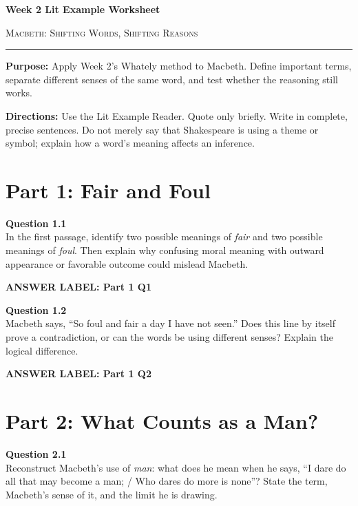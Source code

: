 \documentclass[12pt]{article}
\newcommand{\answerbox}[2]{%
\vspace{0.12em}
\noindent\textbf{#1}\par
\vspace{0.04em}
\noindent\fbox{%
\begin{minipage}[t][#2]{\dimexpr\textwidth-2\fboxsep-2\fboxrule}
\rule{\textwidth}{0pt}
\vspace{#2}
\end{minipage}}
\par\vspace{0.22em}}
\begin{document}
\begin{center}
{\LARGE\bfseries Week 2 Lit Example Worksheet}\par\vspace{0.05em}
{\large\scshape Macbeth: Shifting Words, Shifting Reasons}\par\vspace{0.12em}
\rule{0.78\textwidth}{0.5pt}
\end{center}

\textbf{Purpose:} Apply Week 2's Whately method to Macbeth. Define important terms, separate different senses of the same word, and test whether the reasoning still works.

\textbf{Directions:} Use the Lit Example Reader. Quote only briefly. Write in complete, precise sentences. Do not merely say that Shakespeare is using a theme or symbol; explain how a word's meaning affects an inference.

\section*{Part 1: Fair and Foul}

\textbf{Question 1.1}\\[-0.15em]
In the first passage, identify two possible meanings of \textit{fair} and two possible meanings of \textit{foul}. Then explain why confusing moral meaning with outward appearance or favorable outcome could mislead Macbeth.

\answerbox{ANSWER LABEL: Part 1 Q1}{2.25in}

\textbf{Question 1.2}\\[-0.15em]
Macbeth says, ``So foul and fair a day I have not seen.'' Does this line by itself prove a contradiction, or can the words be using different senses? Explain the logical difference.

\answerbox{ANSWER LABEL: Part 1 Q2}{2.15in}

\newpage

\section*{Part 2: What Counts as a Man?}

\textbf{Question 2.1}\\[-0.15em]
Reconstruct Macbeth's use of \textit{man}: what does he mean when he says, ``I dare do all that may become a man; / Who dares do more is none''? State the term, Macbeth's sense of it, and the limit he is drawing.
\end{document}
